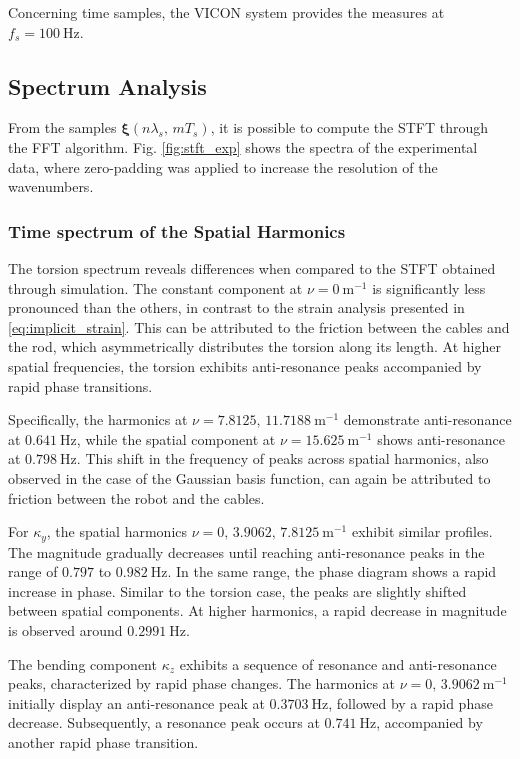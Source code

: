 Concerning time samples, the VICON system provides the measures at $f_s = \SI{100}{\hertz}$.

\subsection{Spectrum Analysis}
From the samples $\bm{\xi}\left(n \lambda_s, \, m T_s\right)$, it is possible to compute the \ac{STFT} through the \ac{FFT} algorithm. Fig. \ref{fig:stft_exp} shows the spectra of the experimental data, where zero-padding was applied to increase the resolution of the wavenumbers. 
\subsubsection{Time spectrum of the Spatial Harmonics}
The torsion spectrum reveals differences when compared to the \ac{STFT} obtained through simulation. The constant component at $\nu = \SI{0}{\meter^{-1}}$ is significantly less pronounced than the others, in contrast to the strain analysis presented in \eqref{eq:implicit_strain}. This can be attributed to the friction between the cables and the rod, which asymmetrically distributes the torsion along its length. At higher spatial frequencies, the torsion exhibits anti-resonance peaks accompanied by rapid phase transitions.

Specifically, the harmonics at $\nu = 7.8125, \, \SI{11.7188}{\meter^{-1}}$ demonstrate anti-resonance at $\SI{0.641}{\hertz}$, while the spatial component at $\nu = \SI{15.625}{\meter^{-1}}$ shows anti-resonance at $\SI{0.798}{\hertz}$. This shift in the frequency of peaks across spatial harmonics, also observed in the case of the Gaussian basis function, can again be attributed to friction between the robot and the cables. 

For $\kappa_y$, the spatial harmonics $\nu = 0, \, 3.9062, \, \SI{7.8125}{\meter^{-1}}$ exhibit similar profiles. The magnitude gradually decreases until reaching anti-resonance peaks in the range of $0.797$ to $\SI{0.982}{\hertz}$. In the same range, the phase diagram shows a rapid increase in phase.
Similar to the torsion case, the peaks are slightly shifted between spatial components. At higher harmonics, a rapid decrease in magnitude is observed around $\SI{0.2991}{\hertz}$.

The bending component $\kappa_z$ exhibits a sequence of resonance and anti-resonance peaks, characterized by rapid phase changes. The harmonics at $\nu = 0, \, \SI{3.9062}{\meter^{-1}}$ initially display an anti-resonance peak at $\SI{0.3703}{\hertz}$, followed by a rapid phase decrease. Subsequently, a resonance peak occurs at $\SI{0.741}{\hertz}$, accompanied by another rapid phase transition.

